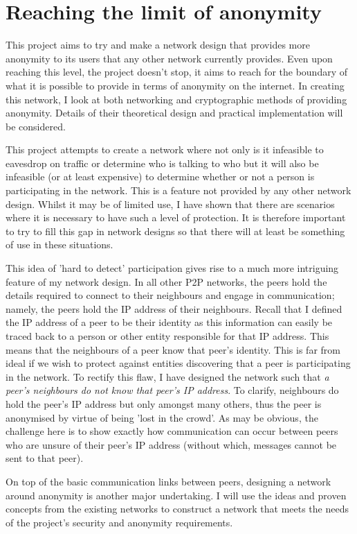 \documentclass[ %
                    author={Luke Murray},
                supervisor={Dr. Simon Hollis},
                     title={Shadow Peer-to-Peer Networks},
                  subtitle={},
                    degree={MEng},
                      year={2013} ]{thesis}
\begin{document}
\section{Reaching the limit of anonymity}

This project aims to try and make a network design that provides more anonymity to its users that any other network currently provides. Even upon reaching this level, the project doesn't stop, it aims to reach for the boundary of what it is possible to provide in terms of anonymity on the internet. In creating this network, I look at both networking and cryptographic methods of providing anonymity. Details of their theoretical design and practical implementation will be considered.

This project attempts to create a network where not only is it infeasible to eavesdrop on traffic or determine who is talking to who but it will also be infeasible (or at least expensive) to determine whether or not a person is participating in the network. This is a feature not provided by any other network design. Whilst it may be of limited use, I have shown that there are scenarios where it is necessary to have such a level of protection. It is therefore important to try to fill this gap in network designs so that there will at least be something of use in these situations.

This idea of 'hard to detect' participation gives rise to a much more intriguing feature of my network design. In all other P2P networks, the peers hold the details required to connect to their neighbours and engage in communication; namely, the peers hold the IP address of their neighbours. Recall that I defined the IP address of a peer to be their identity as this information can easily be traced back to a person or other entity responsible for that IP address. This means that the neighbours of a peer know that peer's identity. This is far from ideal if we wish to protect against entities discovering that a peer is participating in the network. To rectify this flaw, I have designed the network such that {\em a peer's neighbours do not know that peer's IP address}. To clarify, neighbours do hold the peer's IP address but only amongst many others, thus the peer is anonymised by virtue of being 'lost in the crowd'. As may be obvious, the challenge here is to show exactly how communication can occur between peers who are unsure of their peer's IP address (without which, messages cannot be sent to that peer).

On top of the basic communication links between peers, designing a network around anonymity is another major undertaking. I will use the ideas and proven concepts from the existing networks to construct a network that meets the needs of the project's security and anonymity requirements.
\end{document}
